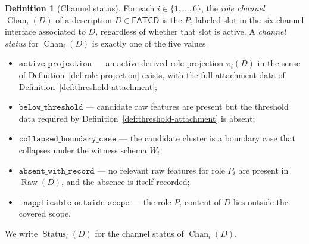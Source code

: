 \documentclass[11pt]{article}
\theoremstyle{definition}
\newtheorem{definition}[theorem]{Definition}
\newcommand{\FATCD}{\ensuremath{\mathsf{FATCD}}}
\newcommand{\Raw}[1]{\ensuremath{\operatorname{Raw}\!\left(#1\right)}}
\newcommand{\Chan}[2]{\ensuremath{\operatorname{Chan}_{#1}\!\left(#2\right)}}
\newcommand{\Status}[2]{\ensuremath{\operatorname{Status}_{#1}\!\left(#2\right)}}
\newcommand{\activeproj}{\texttt{active\_projection}}
\newcommand{\belowthr}{\texttt{below\_threshold}}
\newcommand{\collapsedbc}{\texttt{collapsed\_boundary\_case}}
\newcommand{\absentrec}{\texttt{absent\_with\_record}}
\newcommand{\outsidescope}{\texttt{inapplicable\_outside\_scope}}
\begin{document}
\begin{definition}[Channel status]\label{def:channel-status}
For each \(i \in \{1,\ldots,6\}\), the \emph{role channel}
\(\Chan{i}{D}\) of a description \(D \in \FATCD{}\) is the
\(P_i\)-labeled slot in the six-channel interface associated to \(D\),
regardless of whether that slot is active. A \emph{channel status} for
\(\Chan{i}{D}\) is exactly one of the five values
\begin{itemize}[topsep=2pt,itemsep=1pt]
  \item \(\activeproj\) --- an active derived role projection
    \(\pi_i(D)\) in the sense of
    Definition~\ref{def:role-projection} exists, with the full
    attachment data of
    Definition~\ref{def:threshold-attachment};
  \item \(\belowthr\) --- candidate raw features are present but the
    threshold data required by
    Definition~\ref{def:threshold-attachment} is absent;
  \item \(\collapsedbc\) --- the candidate cluster is a boundary case
    that collapses under the witness schema \(W_i\);
  \item \(\absentrec\) --- no relevant raw features for role \(P_i\) are
    present in \(\Raw{D}\), and the absence is itself recorded;
  \item \(\outsidescope\) --- the role-\(P_i\) content of \(D\) lies
    outside the covered scope.
\end{itemize}
We write \(\Status{i}{D}\) for the channel status of \(\Chan{i}{D}\).
\end{definition}
\end{document}
